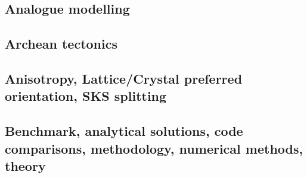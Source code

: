\subsection*{Analogue modelling}

\cite{nabr93}
\cite{clbz08}\cite{fufh08}
\cite{casw15}\cite{rods15}
\cite{casw17}
\cite{pirf18}
\cite{mocb19}\cite{sccs19}

\subsection*{Archean tectonics}

\cite{canc19}

\subsection*{Anisotropy, Lattice/Crystal preferred orientation, SKS splitting}

\cite{besb06}
\cite{faca13}
\cite{facc14}

\subsection*{Benchmark, analytical solutions, code comparisons, methodology, numerical methods, theory}

